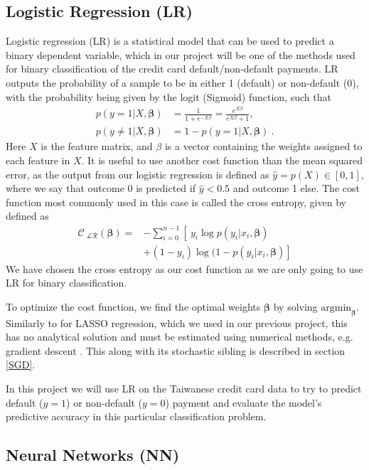 \documentclass[a4paper, 11pt, twocolumn]{article}
\begin{document}
\subsection{Logistic Regression (LR)}
Logistic regression (LR)  is a statistical model that can be used to predict a
binary dependent variable, which in our project will be one of the methods used
for binary classification of the credit card default/non-default payments. LR
outputs the probability of a sample to be in either 1 (default) or non-default (0),
with the probability being given by the logit (Sigmoid) function, such that
\begin{align}
p(y=1 | X, \bm{\beta}) &= \frac{1}{1 + e^{-X \beta}} =\frac{e^{X \beta}}{e^{X \beta}+1},\\
p(y\neq1 | X, \bm{\beta}) &= 1 - p(y=1 | X, \bm{\beta})\ .
\label{eq:LR_probability}
\end{align}
Here $X$ is the feature matrix, and $\beta$ is a vector containing the weights
assigned to each feature in $X$. It is useful to use another cost function than
the mean squared error, as the output from our logistic regression is defined as
$\hat{y}=p(X)\in [0, 1]$, where we say that outcome 0 is predicted if
$\hat{y}< 0.5$ and outcome 1 else. The cost function most commonly used in this
case is called the cross entropy, given by
defined as
\begin{align}
\mathcal{C_\text{ LR}}(\bm{\beta}) =& -\sum_{i=0}^{n-1} \left[\  y_i\log p(y_i|x_i, \bm{\beta}) \right. \nonumber\\
 &\left.+ (1-y_i)\log(1-p(y_i|x_i,\bm{\beta})    \right]
\end{align}
We have chosen the cross entropy as our cost function as we are only going to use
LR for binary classification.

To optimize the cost function, we find the optimal weights $\bm{\beta}$ by
solving $\text{argmin}_{\bm{\beta}}$. Similarly to for LASSO regression, which
we used in our previous project, this has no analytical solution and must be
estimated using numerical methods, e.g. gradient descent \cite{regpaper}. This
along with its stochastic sibling is described in section \ref{SGD}.

In this project we will use LR on the Taiwanese credit card data to try to predict
default ($y=1$) or non-default ($y=0$) payment and evaluate the model's predictive
accuracy in this particular classification problem.

\subsection{Neural Networks (NN)}
\end{document}
